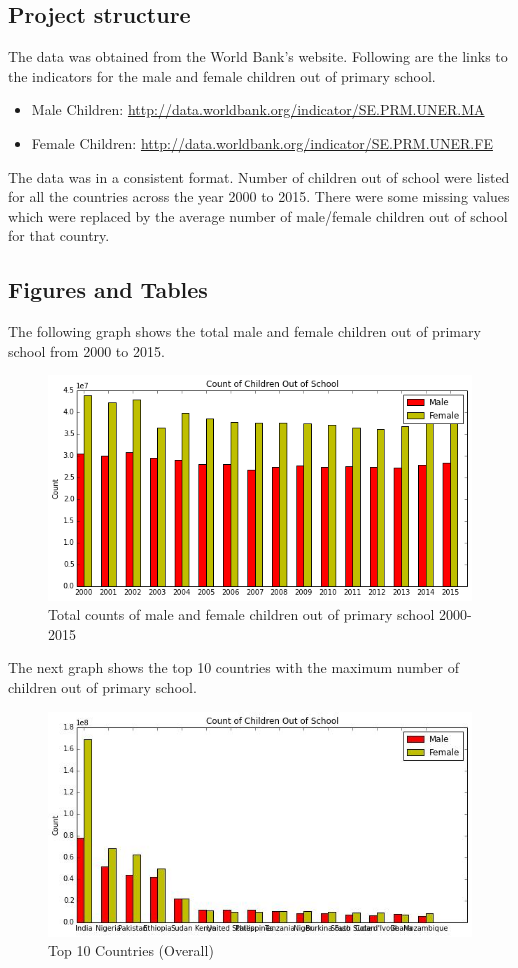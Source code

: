 \documentclass{article}
\begin{document}
\subsection{Project structure}

The data was obtained from the World Bank’s website. Following are the links to the indicators for the male and female children out of primary school.
\begin{itemize}
\item Male Children: \url{http://data.worldbank.org/indicator/SE.PRM.UNER.MA}
\item Female Children: \url{http://data.worldbank.org/indicator/SE.PRM.UNER.FE}
\end{itemize}
The data was in a consistent format. Number of children out of school were listed for all the countries across the year 2000 to 2015. There were some missing values which were replaced by the average number of male/female children out of school for that country.
\subsection{Figures and Tables}

The following graph shows the total male and female children out of primary school from 2000 to 2015.

\begin{figure}[H]
  \centering
    \includegraphics[scale=0.7]{BarTotal}
  \caption{Total counts of male and female children out of primary school 2000-2015}
\end{figure}

The next graph shows the top 10 countries with the maximum number of children out of primary school.
\begin{figure}[H]
  \centering
    \includegraphics[scale=0.7]{Bar10}
  \caption{Top 10 Countries (Overall)}
\end{figure}
\end{document}
